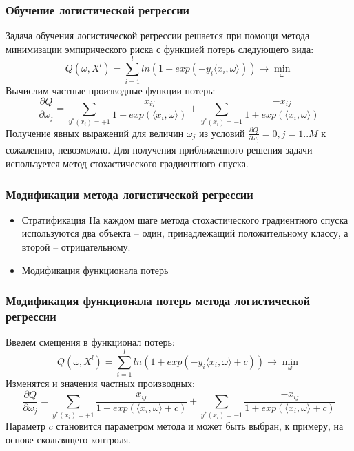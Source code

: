 \documentclass{beamer}
\begin{document}
\begin{frame}
\frametitle{Обучение логистической регрессии}
Задача обучения логистической регрессии решается при помощи метода минимизации эмпирического риска с функцией потерь следующего вида:
$$Q(\omega, X^l)=\sum\limits_{i=1}^l ln(1+exp(-y_i\langle x_i,\omega \rangle))\rightarrow \min\limits_{\omega}$$
Вычислим частные производные функции потерь:
$$\frac{\partial Q}{\partial \omega_j}=\sum\limits_{y^*(x_i)=+1}\frac{x_{ij}}{1+exp(\langle x_i,\omega\rangle)}+\sum\limits_{y^*(x_i)=-1}\frac{-x_{ij}}{1+exp(\langle x_i,\omega\rangle)}$$
Получение явных выражений для величин $\omega_j$ из условий $\frac{\partial Q}{\partial \omega_j}=0, j=1..M$ к сожалению, невозможно. Для получения приближенного решения задачи используется метод стохастического градиентного спуска.
\end{frame}

\begin{frame}
\frametitle{Модификации метода логистической регрессии}
\begin{itemize}
	\item{Стратификация\newline 
		На каждом шаге метода стохастического градиентного спуска используются два объекта – один,
		принадлежащий положительному классу, а второй – отрицательному.
	}
	\item{Модификация функционала потерь}
\end{itemize}
\end{frame}

\begin{frame}
\frametitle{Модификация функционала потерь метода логистической регрессии}
	Введем смещения в функционал потерь:
	$$Q(\omega, X^l)=\sum\limits_{i=1}^l ln(1+exp(-y_i\langle x_i,\omega \rangle +c))\rightarrow \min\limits_{\omega}$$
	Изменятся и значения частных производных:
	$$\frac{\partial Q}{\partial \omega_j}=\sum\limits_{y^*(x_i)=+1}\frac{x_{ij}}{1+exp(\langle x_i,\omega\rangle +c)}+\sum\limits_{y^*(x_i)=-1}\frac{-x_{ij}}{1+exp(\langle x_i,\omega\rangle +c)}$$
	Параметр $c$ становится параметром метода и может быть выбран, к примеру, на основе скользящего контроля.
\end{frame}
\end{document}
